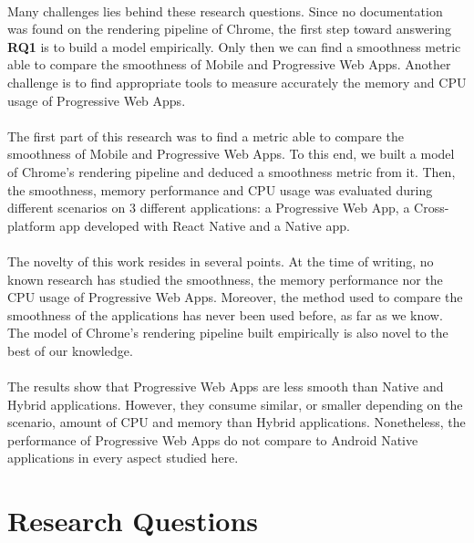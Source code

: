 \documentclass{kththesis}
\begin{document}
\paragraph{}
Many challenges lies behind these research questions. Since no documentation was found on the rendering pipeline of Chrome, the first step toward answering \textbf{RQ1} is to build a model empirically. Only then we can find a smoothness metric able to compare the smoothness of Mobile and Progressive Web Apps. Another challenge is to find appropriate tools to measure accurately the memory and CPU usage of Progressive Web Apps.

\paragraph{}
The first part of this research was to find a metric able to compare the smoothness of Mobile and Progressive Web Apps. To this end, we built a model of Chrome's rendering pipeline and deduced a smoothness metric from it. Then, the smoothness, memory performance and CPU usage was evaluated during different scenarios on 3 different applications: a Progressive Web App, a Cross-platform app developed with React Native and a Native app. 

\paragraph{}
The novelty of this work resides in several points. At the time of writing, no known research has studied the smoothness, the memory performance nor the CPU usage of Progressive Web Apps. Moreover, the method used to compare the smoothness of the applications has never been used before, as far as we know. The model of Chrome's rendering pipeline built empirically is also novel to the best of our knowledge.

\paragraph{}
The results show that Progressive Web Apps are less smooth than Native and Hybrid applications. However, they consume similar, or smaller depending on the scenario, amount of CPU and memory than Hybrid applications. Nonetheless, the performance of Progressive Web Apps do not compare to Android Native applications in every aspect studied here.

\iffalse
\section{Research Questions}
\end{document}
